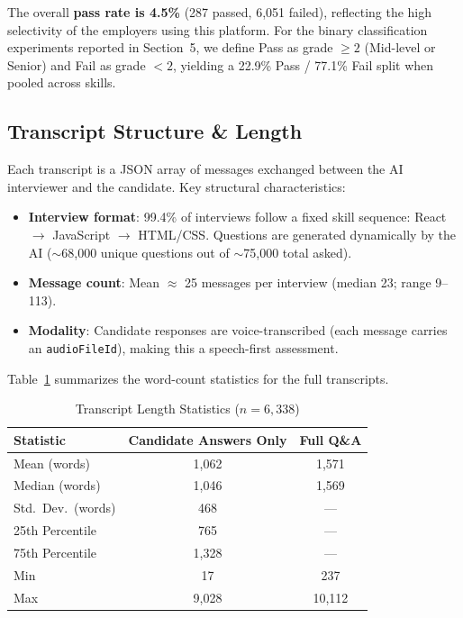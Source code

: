 \documentclass[11pt]{article}
\begin{document}
The overall \textbf{pass rate is 4.5\%} (287 passed, 6,051 failed), reflecting the high selectivity of the employers using this platform. For the binary classification experiments reported in Section~5, we define Pass as grade $\geq 2$ (Mid-level or Senior) and Fail as grade $< 2$, yielding a 22.9\% Pass / 77.1\% Fail split when pooled across skills.

\subsection{Transcript Structure \& Length}

Each transcript is a JSON array of messages exchanged between the AI interviewer and the candidate. Key structural characteristics:

\begin{itemize}
    \item \textbf{Interview format}: 99.4\% of interviews follow a fixed skill sequence: React $\rightarrow$ JavaScript $\rightarrow$ HTML/CSS. Questions are generated dynamically by the AI ($\sim$68,000 unique questions out of $\sim$75,000 total asked).
    \item \textbf{Message count}: Mean $\approx$ 25 messages per interview (median 23; range 9--113).
    \item \textbf{Modality}: Candidate responses are voice-transcribed (each message carries an \texttt{audioFileId}), making this a speech-first assessment.
\end{itemize}

Table~\ref{tab:transcript_length} summarizes the word-count statistics for the full transcripts.

\begin{table}[htbp]
\centering
\caption{Transcript Length Statistics ($n = 6{,}338$)}
\label{tab:transcript_length}
\begin{tabular}{lcc}
\toprule
\textbf{Statistic} & \textbf{Candidate Answers Only} & \textbf{Full Q\&A} \\
\midrule
Mean (words) & 1,062 & 1,571 \\
Median (words) & 1,046 & 1,569 \\
Std.\ Dev.\ (words) & 468 & --- \\
25th Percentile & 765 & --- \\
75th Percentile & 1,328 & --- \\
Min & 17 & 237 \\
Max & 9,028 & 10,112 \\
\bottomrule
\end{tabular}
\end{table}
\end{document}
